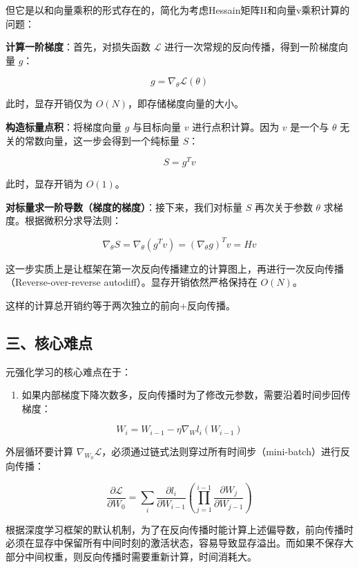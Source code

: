 但它是以和向量乘积的形式存在的，简化为考虑Hessain矩阵H和向量v乘积计算的问题：

\textbf{计算一阶梯度}：首先，对损失函数 \(\mathcal{L}\) 进行一次常规的反向传播，得到一阶梯度向量 \(g\)：

\[
g = \nabla_\theta \mathcal{L}(\theta)
\]

此时，显存开销仅为 \(O(N)\)，即存储梯度向量的大小。

\textbf{构造标量点积}：将梯度向量 \(g\) 与目标向量 \(v\) 进行点积计算。因为 \(v\) 是一个与 \(\theta\) 无关的常数向量，这一步会得到一个纯标量 \(S\)：

\[
S = g^T v
\]

此时，显存开销为 \(O(1)\)。

\textbf{对标量求一阶导数（梯度的梯度）}：接下来，我们对标量 \(S\) 再次关于参数 \(\theta\) 求梯度。根据微积分求导法则：

\[
\nabla_\theta S = \nabla_\theta(g^T v) = (\nabla_\theta g)^T v = Hv
\]

这一步实质上是让框架在第一次反向传播建立的计算图上，再进行一次反向传播（Reverse-over-reverse autodiff）。显存开销依然严格保持在 \(O(N)\)。

这样的计算总开销约等于两次独立的前向+反向传播。

\hypertarget{ux4e09ux6838ux5fc3ux96beux70b9}{%
\subsection{三、核心难点}\label{ux4e09ux6838ux5fc3ux96beux70b9}}

元强化学习的核心难点在于：

\begin{enumerate}
\def\labelenumi{\arabic{enumi}.}
\tightlist
\item
  如果内部梯度下降次数多，反向传播时为了修改元参数，需要沿着时间步回传梯度：
\end{enumerate}

\[
W_i = W_{i-1} - \eta \nabla_W l_i(W_{i-1})
\]

外层循环要计算 \(\nabla_{W_0}\mathcal{L}\)，必须通过链式法则穿过所有时间步（mini-batch）进行反向传播：

\[
\frac{\partial \mathcal{L}}{\partial W_0}
= \sum_i \frac{\partial l_i}{\partial W_{i-1}}
\left(\prod_{j=1}^{i-1} \frac{\partial W_j}{\partial W_{j-1}}\right)
\]

根据深度学习框架的默认机制，为了在反向传播时能计算上述偏导数，前向传播时必须在显存中保留所有中间时刻的激活状态，容易导致显存溢出。而如果不保存大部分中间权重，则反向传播时需要重新计算，时间消耗大。

